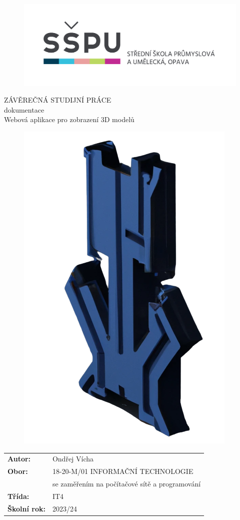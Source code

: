 \documentclass[12pt, a4paper,
twoside,        %
openright
]{report}
\title{\nazevPrace} %
\author{\jmenoAutora} %
\date{\datumOdevzdani} %
\newcommand\obor{INFORMAČNÍ TECHNOLOGIE} %
\newcommand\kodOboru{18-20-M/01} %
\newcommand\zamereni{se zaměřením na počítačové sítě a programování} %
\newcommand\trida{IT4} %
\newcommand\jmenoAutora{Ondřej Vícha}  %
\newcommand\skolniRok{2023/24} %
\newcommand\nazevPrace{Webová aplikace pro zobrazení 3D modelů} %
\begin{document}
	
	\pagestyle{empty}
	
	\cleardoublepage

	
	{\selectfont
		\begin{figure}[h]
			\centering
			\includegraphics[width=0.6\linewidth]{image/logo-skoly.png} 
		\end{figure}
		
		
		{\bfseries %
			\begin{center}
				\vspace{0.025 \textheight}
				\LARGE{ZÁVĚREČNÁ STUDIJNÍ PRÁCE}\\
				\large{dokumentace}\\
				\vspace{0.075 \textheight}
				\LARGE {\nazevPrace}\\
			\end{center}  
		}%
		
		\begin{figure}[h]
			\centering
			\includegraphics[width=0.2\linewidth]{image/logo-background.png} 
		\end{figure}
		
		\vspace{0.02 \textheight}
		\begin{table}[h!]
			\begin{tabular}{ll}
				\textbf{Autor:} & \jmenoAutora\\ 
				\textbf{Obor:} & \kodOboru { } \obor\\
				\textbf{} & \zamereni\\
				\textbf{Třída:} & \trida\\
				\textbf{Školní rok:} & \skolniRok\\
			\end{tabular}
			
		\end{table}		
	}
	
\end{document}
